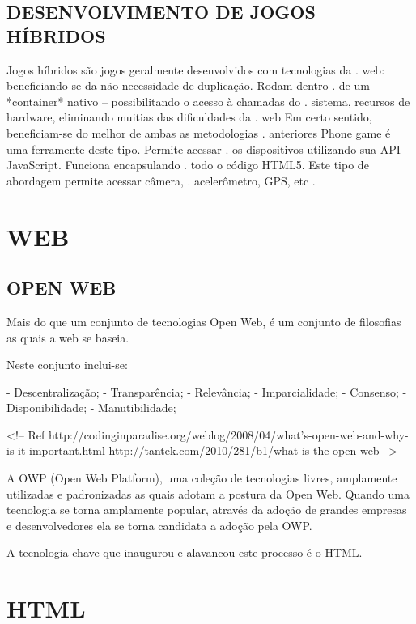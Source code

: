 \documentclass[11pt,a4paper]{article}
\begin{document}
\subsection{DESENVOLVIMENTO DE JOGOS HÍBRIDOS}

Jogos híbridos são jogos geralmente desenvolvidos com tecnologias da .
web: beneficiando-se da não necessidade de duplicação. Rodam dentro .
de um *container* nativo – possibilitando o acesso à chamadas do    .
sistema, recursos de hardware, eliminando muitias das dificuldades da  .
web Em certo sentido, beneficiam-se do melhor de ambas as metodologias .
anteriores Phone game é uma ferramente deste tipo. Permite acessar    .
os dispositivos utilizando sua API JavaScript. Funciona encapsulando   .
todo o código HTML5. Este tipo de abordagem permite acessar câmera,  .
acelerômetro, GPS, etc                                                .

\section{WEB}

\subsection{OPEN WEB}

Mais do que um conjunto de tecnologias Open Web, é um conjunto de filosofias as quais a web se baseia.

Neste conjunto inclui-se:

- Descentralização;
- Transparência;
- Relevância;
- Imparcialidade;
- Consenso;
- Disponibilidade;
- Manutibilidade;

<!-- Ref
http://codinginparadise.org/weblog/2008/04/what's-open-web-and-why-is-it-important.html
http://tantek.com/2010/281/b1/what-is-the-open-web
-->

A OWP (Open Web Platform), uma coleção de tecnologias livres, amplamente utilizadas e padronizadas as quais adotam a postura da Open Web. Quando uma tecnologia se torna amplamente popular, através da adoção de grandes empresas e desenvolvedores ela se torna candidata a adoção pela OWP. 

A tecnologia chave que inaugurou e alavancou este processo é o HTML. 

\section{HTML}
\end{document}

